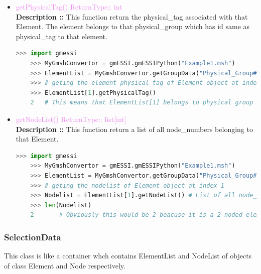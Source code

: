 \documentclass[11pt]{article}
\begin{document}
\begin{itemize}
    \item \textcolor{violet}{getPhysicalTag() \hfill {ReturnType:: int}} \\
    \textbf{Description ::} This function return the physical\_tag associated with that Element. The element belongs to that physical\_group which has id same as physical\_tag to that element.  
    \begin{lstlisting}[language=Python]
    >>> import gmessi
    >>> MyGmshConvertor = gmESSI.gmESSIPython("Example1.msh")
    >>> ElementList = MyGmshConvertor.getGroupData("Physical_Group#ApplyForce").ElementList
    >>> # geting the element physical_tag of Element object at index 1     
    >>> ElementList[1].getPhysicalTag()
    2   # This means that ElementList[1] belongs to physical group having id 2 
    \end{lstlisting} 

    \item \textcolor{violet}{getNodeList() \hfill {ReturnType:: list[int]}} \\
    \textbf{Description ::} This function return a list of all node\_numbers belonging to that Element.   
    \begin{lstlisting}[language=Python]
    >>> import gmessi
    >>> MyGmshConvertor = gmESSI.gmESSIPython("Example1.msh")
    >>> ElementList = MyGmshConvertor.getGroupData("Physical_Group#ApplyForce").ElementList
    >>> # geting the nodelist of Element object at index 1     
    >>> Nodelist = ElementList[1].getNodeList() # List of all node_no belonging to Element object at index 1
    >>> len(Nodelist) 
    2       # Obviously this would be 2 beacuse it is a 2-noded element so, each element has exactly 2 nodes.
    \end{lstlisting} 

\end{itemize}

\subsubsection{SelectionData}
This class is like a container whch contains ElementList and NodeList of objects of class Element and Node respectively.  
\end{document}

